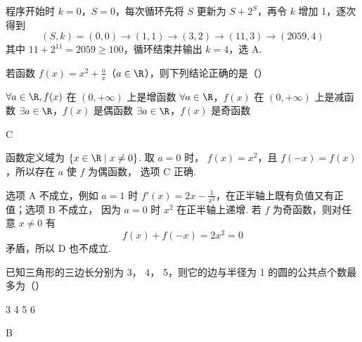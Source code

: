 \begin{solution}
程序开始时 \(k=0\)，\(S=0\)，每次循环先将 \(S\) 更新为 \(S+2^S\)，再令
\(k\) 增加 1，逐次得到
\[
(S,k)=(0,0)\to(1,1)\to(3,2)\to(11,3)\to(2059,4)
\]
其中 \(11+2^{11}=2059\geqslant100\)，循环结束并输出 \(k=4\)，选 A.
\end{solution}

\begin{problem}
若函数 \( f(x) = x^2 + \frac{a}{x} \)（\(a \in \R\)），则下列结论正确的是（\quad）

\choices
    {\(\forall a\in \R,f(x)\) 在 \((0, + \infty)\) 上是增函数}
    {\(\forall a\in \R\)，\(f(x)\) 在 \((0, + \infty)\) 上是减函数}
    {\(\exists a\in \R\)，\(f(x)\) 是偶函数}
    {\(\exists a\in \R\)，\(f(x)\) 是奇函数}
\end{problem}

\begin{answer}
C
\end{answer}

\begin{solution}
函数定义域为 \(\{x\in\R\mid x\ne0\}\). 取 \(a=0\) 时，
\(f(x)=x^2\)，且 \(f(-x)=f(x)\)，所以存在 \(a\) 使 \(f\) 为偶函数，
选项 C 正确.

选项 A 不成立，例如 \(a=1\) 时
\(f'(x)=2x-\frac{1}{x^2}\)，在正半轴上既有负值又有正值；选项 B 不成立，
因为 \(a=0\) 时 \(x^2\) 在正半轴上递增. 若 \(f\) 为奇函数，则对任意
\(x\neq0\) 有
\[
f(x)+f(-x)=2x^2=0
\]
矛盾，所以 D 也不成立.
\end{solution}

\begin{problem}
已知三角形的三边长分别为 3， 4， 5，则它的边与半径为 1 的圆的公共点个数最多为（\quad）

\choices
    {3}
    {4}
    {5}
    {6}
\end{problem}

\begin{answer}
B
\end{answer}

